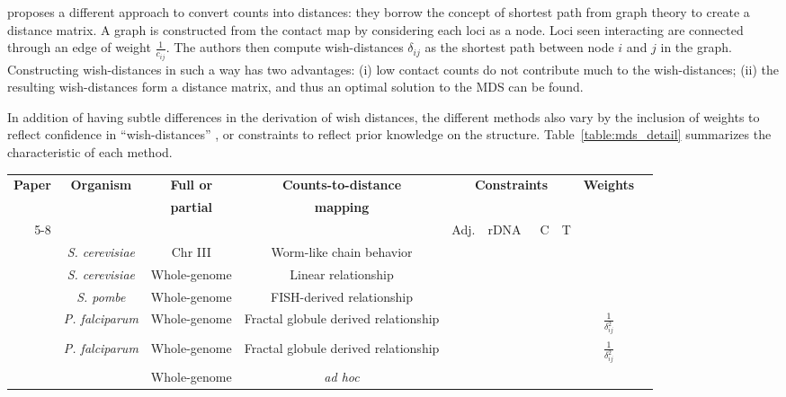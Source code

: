 \documentclass[letterpaper,12pt]{article}
\newcommand*\CHECK{\ding{51}}
\begin{document}
\citet{lesne:3d} proposes a different approach to convert counts into
distances: they borrow the concept of shortest path from graph theory to
create a distance matrix. A graph is constructed from the contact map by
considering each loci as a node. Loci seen interacting are connected through
an edge of weight $\frac{1}{c_{ij}}$. The authors then compute wish-distances
$\delta_{ij}$ as the shortest path between node $i$ and $j$ in the graph.
Constructing wish-distances in such a way has two advantages: (i) low contact
counts do not contribute much to the wish-distances; (ii) the resulting
wish-distances form a distance matrix, and thus an optimal solution to the MDS
can be found.

In addition of having subtle differences in the derivation of wish distances,
the different methods also vary by the inclusion of weights to reflect
confidence in ``wish-distances'' \citep{ay:three-dimensional}, or constraints
to reflect prior knowledge on the structure. Table~\ref{table:mds_detail}
summarizes the characteristic of each method.

\begin{table*}
\scriptsize
\centering
\begin{tabular}{rccccccccc}
\hline
\multirow{2}{*}{\textbf{Paper}} & \multirow{2}{*}{\textbf{Organism}} &
\textbf{Full or}
& \textbf{Counts-to-distance} &
\multicolumn{4}{c}{\multirow{2}{*}{\textbf{Constraints}}}
& \multirow{2}{*}{\textbf{Weights}}\\
 & & \textbf{partial} & \textbf{mapping} &  \\
 \cmidrule(lr){5-8} 
 & & & & Adj. & rDNA & C & T & \\
\hline
\cite{dekker:capturing} & {\em S. cerevisiae} & Chr III & Worm-like chain
behavior & & & & \\
\cite{duan:three-dimensional} & {\em S. cerevisiae} & Whole-genome & Linear
relationship & \CHECK &  \CHECK & \CHECK &  & \\
\cite{tanizawa:mapping} & {\em S. pombe} & Whole-genome &
FISH-derived relationship & \CHECK & \CHECK & \CHECK & \CHECK &  \\
\cite{ay:three-dimensional} & {\em P. falciparum} & Whole-genome & Fractal
globule derived relationship & \CHECK  & & &
& $\frac{1}{\delta_{ij}^2}$ \\
\cite{peng:sequencing} & {\em P. falciparum} & Whole-genome & Fractal
globule derived relationship & \CHECK  & & &
 & $\frac{1}{\delta_{ij}^2}$ \\
\cite{lesne:3d} & & Whole-genome & \textit{ad hoc} & & & & & \
\end{tabular}
\caption{Differences between MDS-based methods}{}
\label{table:mds_detail}
\end{table*}
\end{document}
